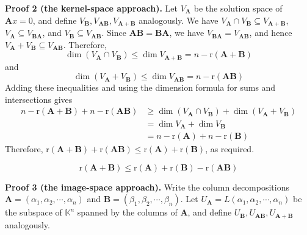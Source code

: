 \documentclass[12pt, a4paper, oneside]{book}
\begin{document}
\begin{question}
    \textbf{Proof 2 (the kernel-space approach).}
    Let $V_\mathbf{A}$ be the solution space of ${\mathbf{A} x}=0$, and define $V_\mathbf{B}, V_{\mathbf{A} \mathbf{B}}, V_{\mathbf{A}+\mathbf{B}}$ analogously. We have $V_\mathbf{A} \cap V_\mathbf{B} \subseteq V_{\mathbf{A}+\mathbf{B}}$, $V_\mathbf{A} \subseteq V_{\mathbf{B} \mathbf{A}}$, and $V_\mathbf{B} \subseteq V_{\mathbf{A} \mathbf{B}}$. Since ${\mathbf{A} \mathbf{B}}=\mathbf{B} \mathbf{A}$, we have $V_{\mathbf{B} \mathbf{A}}=V_{\mathbf{A} \mathbf{B}}$, and hence $V_\mathbf{A}+V_\mathbf{B} \subseteq V_{\mathbf{A} \mathbf{B}}$. Therefore,
    \[
        \operatorname{dim}\left(V_{\mathbf{A}} \cap V_{\mathbf{B}}\right) \leq \operatorname{dim} V_{\mathbf{A}+\mathbf{B}}=n-\mathrm{r}(\mathbf{A}+\mathbf{B})
    \]
    and
    \[
        \operatorname{dim}\left(V_{\mathbf{A}}+V_{\mathbf{B}}\right) \leq \operatorname{dim} V_{\mathbf{A} \mathbf{B}}=n-\mathrm{r}(\mathbf{A} \mathbf{B})
    \]
    Adding these inequalities and using the dimension formula for sums and intersections gives
    \[
        \begin{aligned}
            n-\mathrm{r}(\mathbf{A}+\mathbf{B})+n-\mathrm{r}(\mathbf{A} \mathbf{B}) & \geq \operatorname{dim}\left(V_{\mathbf{A}} \cap V_{\mathbf{B}}\right)+\operatorname{dim}\left(V_{\mathbf{A}}+V_{\mathbf{B}}\right) \\
                                                                                    & =\operatorname{dim} V_{\mathbf{A}}+\operatorname{dim} V_{\mathbf{B}}                                                                \\
                                                                                    & =n-\mathrm{r}(\mathbf{A})+n-\mathrm{r}(\mathbf{B})
        \end{aligned}
    \]
    Therefore, $\mathrm{r}(\mathbf{A}+\mathbf{B})+\mathrm{r}(\mathbf{A} \mathbf{B}) \leq \mathrm{r}(\mathbf{A})+\mathrm{r}(\mathbf{B})$, as required.

    \[
        \mathrm{r}(\mathbf{A}+\mathbf{B}) \leq \mathrm{r}(\mathbf{A})+\mathrm{r}(\mathbf{B})-\mathrm{r}(\mathbf{A} \mathbf{B})
    \]

    \textbf{Proof 3 (the image-space approach).}
    Write the column decompositions $\mathbf{A}=\left({\alpha}_1, {\alpha}_2, \cdots, {\alpha}_n\right)$ and $\mathbf{B}=\left({\beta}_1, {\beta}_2, \cdots, {\beta}_n\right)$. Let $U_{\mathbf{A}}=L\left({\alpha}_1, {\alpha}_2, \cdots, {\alpha}_n\right)$ be the subspace of $\mathbb{K}^n$ spanned by the columns of $\mathbf{A}$, and define $U_{\mathbf{B}}, U_{{\mathbf{A} \mathbf{B}}}, U_{\mathbf{A}+\mathbf{B}}$ analogously.


\end{question}
\end{document}
